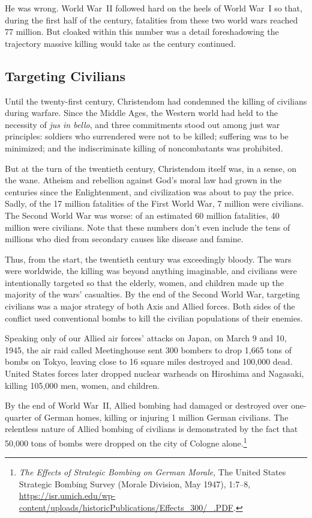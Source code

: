 \documentclass[
]{book}
\begin{document}
He was wrong. World War~II followed hard on the heels of World War~I so that, during the first half of the century, fatalities from these two world wars reached 77 million. But cloaked within this number was a detail foreshadowing the trajectory massive killing would take as the century continued.

\hypertarget{targeting-civilians}{%
\subsection{Targeting Civilians}\label{targeting-civilians}}

Until the twenty-first century, Christendom had condemned the killing of civilians during warfare. Since the Middle Ages, the Western world had held to the necessity of \emph{jus in bello}, and three commitments stood out among just war principles: soldiers who surrendered were not to be killed; suffering was to be minimized; and the indiscriminate killing of noncombatants was prohibited.

But at the turn of the twentieth century, Christendom itself was, in a sense, on the wane. Atheism and rebellion against God's moral law had grown in the centuries since the Enlightenment, and civilization was about to pay the price. Sadly, of the 17 million fatalities of the First World War, 7 million were civilians. The Second World War was worse: of an estimated 60 million fatalities, 40 million were civilians. Note that these numbers don't even include the tens of millions who died from secondary causes like disease and famine.

Thus, from the start, the twentieth century was exceedingly bloody. The wars were worldwide, the killing was beyond anything imaginable, and civilians were intentionally targeted so that the elderly, women, and children made up the majority of the wars' casualties. By the end of the Second World War, targeting civilians was a major strategy of both Axis and Allied forces. Both sides of the conflict used conventional bombs to kill the civilian populations of their enemies.

Speaking only of our Allied air forces' attacks on Japan, on March 9 and 10, 1945, the air raid called Meetinghouse sent 300 bombers to drop 1,665 tons of bombs on Tokyo, leaving close to 16 square miles destroyed and 100,000 dead. United States forces later dropped nuclear warheads on Hiroshima and Nagasaki, killing 105,000 men, women, and children.

By the end of World War~II, Allied bombing had damaged or destroyed over one-quarter of German homes, killing or injuring 1 million German civilians. The relentless nature of Allied bombing of civilians is demonstrated by the fact that 50,000 tons of bombs were dropped on the city of Cologne alone.\footnote{\emph{The Effects of Strategic Bombing on German Morale}, The United States Strategic Bombing Survey (Morale Division, May 1947), 1:7--8, \url{https://isr.umich.edu/wp-content/uploads/historicPublications/Effects_300/_.PDF}.}
\end{document}
